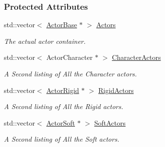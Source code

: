 \subsubsection*{Protected Attributes}
\begin{DoxyCompactItemize}
\item 
\hypertarget{classMezzanine_1_1ActorManager_a12a65a58aab87b083e6718cb8fa3aa2c}{
std::vector$<$ \hyperlink{classMezzanine_1_1ActorBase}{ActorBase} $\ast$ $>$ \hyperlink{classMezzanine_1_1ActorManager_a12a65a58aab87b083e6718cb8fa3aa2c}{Actors}}
\label{classMezzanine_1_1ActorManager_a12a65a58aab87b083e6718cb8fa3aa2c}

\begin{DoxyCompactList}\small\item\em The actual actor container. \item\end{DoxyCompactList}\item 
\hypertarget{classMezzanine_1_1ActorManager_a07fba4f64f1a9162d3a12916d6ef29bd}{
std::vector$<$ ActorCharacter $\ast$ $>$ \hyperlink{classMezzanine_1_1ActorManager_a07fba4f64f1a9162d3a12916d6ef29bd}{CharacterActors}}
\label{classMezzanine_1_1ActorManager_a07fba4f64f1a9162d3a12916d6ef29bd}

\begin{DoxyCompactList}\small\item\em A Second listing of All the Character actors. \item\end{DoxyCompactList}\item 
\hypertarget{classMezzanine_1_1ActorManager_a1283d3955dc83831c7687573b6cff206}{
std::vector$<$ \hyperlink{classMezzanine_1_1ActorRigid}{ActorRigid} $\ast$ $>$ \hyperlink{classMezzanine_1_1ActorManager_a1283d3955dc83831c7687573b6cff206}{RigidActors}}
\label{classMezzanine_1_1ActorManager_a1283d3955dc83831c7687573b6cff206}

\begin{DoxyCompactList}\small\item\em A Second listing of All the Rigid actors. \item\end{DoxyCompactList}\item 
\hypertarget{classMezzanine_1_1ActorManager_ad3a985b2087fc1353f7d33485589207b}{
std::vector$<$ \hyperlink{classMezzanine_1_1ActorSoft}{ActorSoft} $\ast$ $>$ \hyperlink{classMezzanine_1_1ActorManager_ad3a985b2087fc1353f7d33485589207b}{SoftActors}}
\label{classMezzanine_1_1ActorManager_ad3a985b2087fc1353f7d33485589207b}

\begin{DoxyCompactList}\small\item\em A Second listing of All the Soft actors. \item\end{DoxyCompactList}\end{DoxyCompactItemize}


